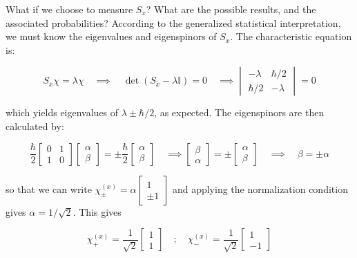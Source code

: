 \documentclass[12pt, titlepage]{article}
\begin{document}
What if we choose to measure $S_x$? What are the possible results, and the associated probabilities? According to the generalized statistical interpretation, we must know the eigenvalues and eigenspinors of $S_x$. The characteristic equation is:

\begin{equation*}
	S_x\chi = \lambda\chi \quad\implies\quad \det(S_x-\lambda\mathbb{I}) = 0 \quad\implies \begin{vmatrix}-\lambda & \hbar/2 \\ \hbar/2 & -\lambda \end{vmatrix} = 0
\end{equation*}

which yields eigenvalues of $\lambda \pm\hbar/2$, as expected. The eigenspinors are then calculated by:

\begin{equation*}
	\frac{\hbar}{2}\begin{bmatrix}0 & 1 \\ 1 & 0 \end{bmatrix}\begin{bmatrix} \alpha \\ \beta \end{bmatrix} = \pm\frac{\hbar}{2}\begin{bmatrix} \alpha \\ \beta \end{bmatrix} \quad\implies \begin{bmatrix} \beta \\ \alpha \end{bmatrix} = \pm\begin{bmatrix} \alpha \\ \beta \end{bmatrix} \quad\implies\quad \beta = \pm\alpha
\end{equation*}

so that we can write $\chi_{\pm}^{(x)} = \alpha \begin{bmatrix} 1 \\ \pm 1\end{bmatrix}$ and applying the normalization condition gives $\alpha = 1/\sqrt{2}$. This gives

\begin{equation}
	\chi_+^{(x)} = \frac{1}{\sqrt{2}}\begin{bmatrix} 1 \\ 1\end{bmatrix} \quad;\quad \chi_-^{(x)} = \frac{1}{\sqrt{2}}\begin{bmatrix} 1 \\ -1\end{bmatrix}
\end{equation}
\end{document}
